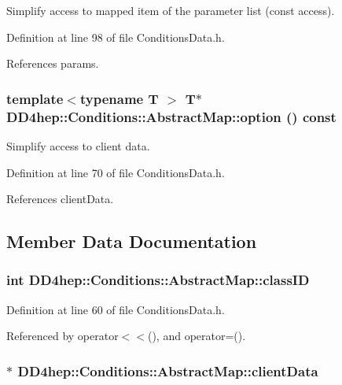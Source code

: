 Simplify access to mapped item of the parameter list (const access). 

Definition at line 98 of file ConditionsData.h.

References params.\hypertarget{class_d_d4hep_1_1_conditions_1_1_abstract_map_a94270429e536d39abb3ed8a204cfbc19}{
\subsubsection[{option}]{\setlength{\rightskip}{0pt plus 5cm}template$<$typename T $>$ {\bf T}$\ast$ DD4hep::Conditions::AbstractMap::option () const}}
\label{class_d_d4hep_1_1_conditions_1_1_abstract_map_a94270429e536d39abb3ed8a204cfbc19}


Simplify access to client data. 

Definition at line 70 of file ConditionsData.h.

References clientData.

\subsection{Member Data Documentation}
\hypertarget{class_d_d4hep_1_1_conditions_1_1_abstract_map_a33a343986fada98f91b7118368fa7248}{
\subsubsection[{classID}]{\setlength{\rightskip}{0pt plus 5cm}int {\bf DD4hep::Conditions::AbstractMap::classID}}}
\label{class_d_d4hep_1_1_conditions_1_1_abstract_map_a33a343986fada98f91b7118368fa7248}


Definition at line 60 of file ConditionsData.h.

Referenced by operator$<$$<$(), and operator=().\hypertarget{class_d_d4hep_1_1_conditions_1_1_abstract_map_a4255c1d1d93eb1ecfee921ed752a54da}{
\subsubsection[{clientData}]{$\ast$ {\bf DD4hep::Conditions::AbstractMap::clientData}}}
\label{class_d_d4hep_1_1_conditions_1_1_abstract_map_a4255c1d1d93eb1ecfee921ed752a54da}


